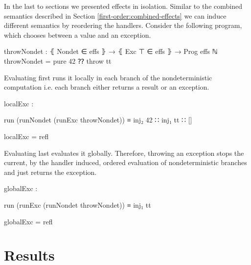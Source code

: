 In the last to sections we presented effects in isolation.
Similar to the combined semantics described in Section
\ref{first-order:combined-effects} we can induce different semantics by
reordering the handlers.
Consider the following program, which chooses between a
 value and an exception.

\begin{code}
throwNondet : ⦃ Nondet ∈ effs ⦄ → ⦃ Exc ⊤ ∈ effs ⦄ → Prog effs ℕ
throwNondet = pure 42 ⁇ throw tt
\end{code}
Evaluating  first runs it locally in each branch of the
nondeterministic computation i.e. each branch either returns a result or an
exception. 
\begin{center}
\begin{code}
localExc : 
\end{code}
\begin{code}[inline]
 run (runNondet (runExc throwNondet)) ≡ inj₂ 42 ∷ inj₁ tt ∷ []
\end{code}
\begin{code}
localExc = refl
\end{code}
\end{center}
Evaluating  last evaluates it globally.
Therefore, throwing an exception stops the current, by the 
handler induced, ordered evaluation of nondeterministic branches and just
returns the exception.
\begin{center}
\begin{code}
globalExc : 
\end{code}
\begin{code}[inline]
 run (runExc (runNondet throwNondet)) ≡ inj₁ tt
\end{code}
\begin{code}
globalExc = refl
\end{code}
\end{center}


\section{Results}

